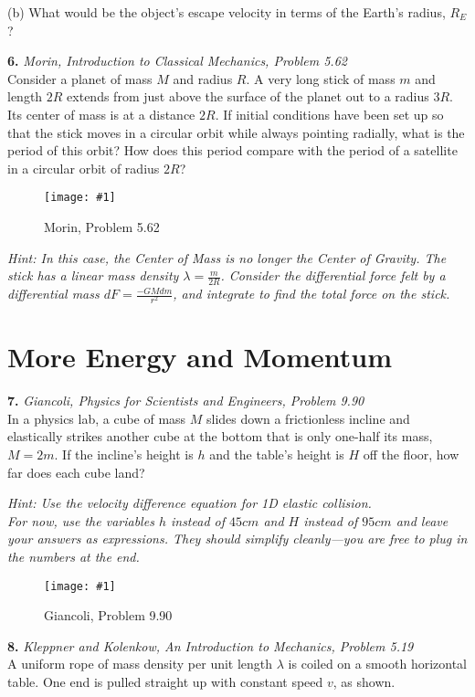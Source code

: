\documentclass[11pt]{article}
\newcommand{\fig}[4]{
    \begin{figure}[H]
        \centering
        \texttt{[image: \#1]}
        \caption{#2}
        \label{exp4fit}
    \end{figure}
}
\theoremstyle{gangnamstyle}{\newtheorem{definition}{Definition}[]}
\theoremstyle{gangnamstyle}{\newtheorem{example}{Example}[]}
\theoremstyle{gangnamstyle}{\newtheorem{problem}{Problem}[]}
\begin{document}
(b) What would be the object’s escape velocity in terms of the Earth’s radius, $R_E$?

\pagebreak

\textbf{6.} \textit{Morin, Introduction to Classical Mechanics, Problem 5.62} \\
Consider a planet of mass $M$ and radius $R$. A very long stick of mass $m$ and length $2R$ extends from just above the surface of the planet out to a radius $3R$. Its center of mass is at a distance $2R$. If initial conditions have been set up so that the stick moves in a circular orbit while always pointing radially, what is the period of this orbit? How does this period compare with the period of a satellite in a circular orbit of radius $2R$?
\fig{figs/0716/m562.png}{Morin, Problem 5.62}{0.5}{0}
\textit{Hint: In this case, the Center of Mass is no longer the Center of Gravity. The stick has a linear mass density $\lambda = \frac{m}{2R}$. Consider the differential force felt by a differential mass $dF = \frac{-GM dm}{r^2}$, and integrate to find the total force on the stick.}

\pagebreak

\section{More Energy and Momentum}

\textbf{7.} \textit{Giancoli, Physics for Scientists and Engineers, Problem 9.90} \\
In a physics lab, a cube of mass $M$ slides down a frictionless incline and elastically strikes another cube at the bottom that is only one-half its mass, $M = 2m$. If the incline's height is $h$ and the table's height is $H$ off the floor, how far does each cube land?

\textit{Hint: Use the velocity difference equation for 1D elastic collision. \\ For now, use the variables $h$ instead of $45 cm$ and $H$ instead of $95 cm$ and leave your answers as expressions. They should simplify cleanly---you are free to plug in the numbers at the end. }
\fig{figs/0716/g990.png}{Giancoli, Problem 9.90}{0.5}{0}

\pagebreak

\textbf{8.} \textit{Kleppner and Kolenkow, An Introduction to Mechanics, Problem 5.19} \\
A uniform rope of mass density per unit length $\lambda$ is coiled on a smooth horizontal table. One end is pulled straight up with constant speed $v$, as shown.
\end{document}
